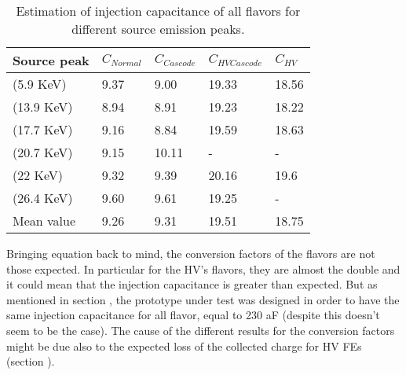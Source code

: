 \begin{table}[h!]
\centering
\begin{tabular}{>{} C{2.8cm}|C{1.7cm}|C{1.8cm}|C{1.7cm}|C{1.7cm}}
Source peak & $C_{Normal}$ & $C_{Cascode}$ & $C_{HV Cascode}$ & $C_{HV}$\\[2ex]
\hline
{} (5.9 KeV) & 9.37 & 9.00 & 19.33 & 18.56 \\[0.5ex]
\hline
{} (13.9 KeV) & 8.94 & 8.91 & 19.23 & 18.22 \\[0.5ex]
\hline
{} (17.7 KeV) & 9.16 & 8.84 & 19.59 & 18.63 \\[0.5ex]
\hline
{} (20.7 KeV) & 9.15 & 10.11 & - & -\\[0.5ex]
\hline
{} (22 KeV) & 9.32 & 9.39 & 20.16 & 19.6 \\[0.5ex]
\hline
{} (26.4 KeV) & 9.60 & 9.61 & 19.25 & - \\[1.5ex]
\hline
{}Mean value & 9.26 & 9.31 & 19.51 & 18.75 \\[1.5ex]
\end{tabular}
\caption{Estimation of injection capacitance of all flavors for different source emission peaks.}
\label{tab:cap_mean}
\end{table}


Bringing equation  back to mind, the conversion factors of the flavors are not those expected. In particular for the HV's flavors, they are almost the double and it could mean that the injection capacitance is greater than expected. But as mentioned in section , the prototype under test was designed in order to have the same injection capacitance for all flavor, equal to 230 aF (despite this doesn't seem to be the case).
The cause of the different results for the conversion factors might be due also to the expected loss of the collected charge for HV FEs (section ).




